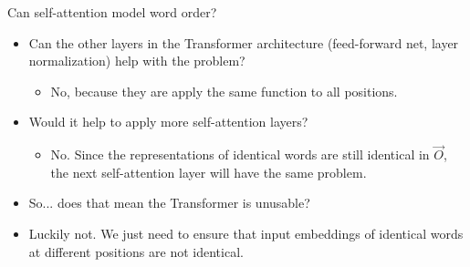 \documentclass[11pt,compress,t,notes=noshow, xcolor=table]{beamer}
\begin{document}

\begin{vbframe}{Can self-attention model word order?}

\vfill

\begin{itemize}
\item \ques Can the other layers in the Transformer architecture (feed-forward net, layer normalization) help with the problem?
\begin{itemize}
\item No, because they are apply the same function to all positions.
\end{itemize}
\item \ques Would it help to apply more self-attention layers?
\begin{itemize}
\item No. Since the representations of identical words are still identical in $\vec O$, the next self-attention layer will have the same problem.
\end{itemize}
\item So... does that mean the Transformer is unusable?
\item Luckily not. We just need to ensure that input embeddings of identical words at different positions are not identical. 
\end{itemize}

\vfill

\end{vbframe}

\end{document}
